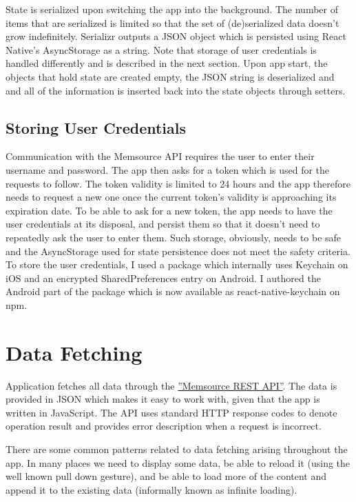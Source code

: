 State is serialized upon switching the app into the background. The number of items that are serialized is limited so that the set of (de)serialized data doesn't grow indefinitely. Serializr outputs a JSON object which is persisted using React Native’s AsyncStorage as a string. Note that storage of user credentials is handled differently and is described in the next section. Upon app start, the objects that hold state are created empty, the JSON string is deserialized and and all of the information is inserted back into the state objects through setters. 


\subsection{Storing User Credentials}

Communication with the Memsource API requires the user to enter their username and password. The app then asks for a token which is used for the requests to follow. The token validity is limited to 24 hours and the app therefore needs to request a new one once the current token's validity is approaching its expiration date. To be able to ask for a new token, the app needs to have the user credentials at its disposal, and persist them so that it doesn't need to repeatedly ask the user to enter them. Such storage, obviously, needs to be safe and the AsyncStorage used for state persistence does not meet the safety criteria. To store the user credentials, I used a package which internally uses Keychain on iOS and an encrypted SharedPreferences entry on Android. I authored the Android part of the package which is now available as react-native-keychain on npm. 

\section{Data Fetching}

Application fetches all data through the \href{http://wiki.memsource.com/wiki/Memsource_API#API_Reference}{''Memsource REST API''}. The data is provided in JSON which makes it easy to work with, given that the app is written in JavaScript. The API uses standard HTTP response codes to denote operation result and provides error description when a request is incorrect.

There are some common patterns related to data fetching arising throughout the app. In many places we need to display some data, be able to reload it (using the well known pull down gesture), and be able to load more of the content and append it to the existing data (informally known as infinite loading).

